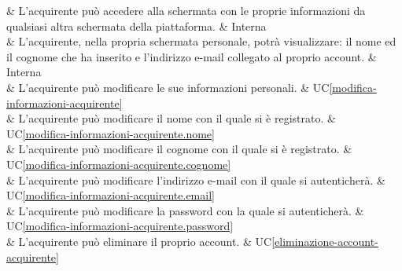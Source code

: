  & L'acquirente può accedere alla schermata con le proprie informazioni da qualsiasi altra schermata della piattaforma. & Interna \\

 & L'acquirente, nella propria schermata personale, potrà visualizzare: il nome ed il cognome che ha inserito e l'indirizzo e-mail collegato al proprio account. & Interna \\

 & L'acquirente può modificare le sue informazioni personali. & UC\ref{modifica-informazioni-acquirente} \\

 & L'acquirente può modificare il nome con il quale si è registrato. & UC\ref{modifica-informazioni-acquirente.nome} \\

 & L'acquirente può modificare il cognome con il quale si è registrato. & UC\ref{modifica-informazioni-acquirente.cognome} \\

 & L'acquirente può modificare l'indirizzo e-mail con il quale si autenticherà. & UC\ref{modifica-informazioni-acquirente.email} \\

 & L'acquirente può modificare la password con la quale si autenticherà. & UC\ref{modifica-informazioni-acquirente.password} \\

 & L'acquirente può eliminare il proprio account. & UC\ref{eliminazione-account-acquirente} \\







